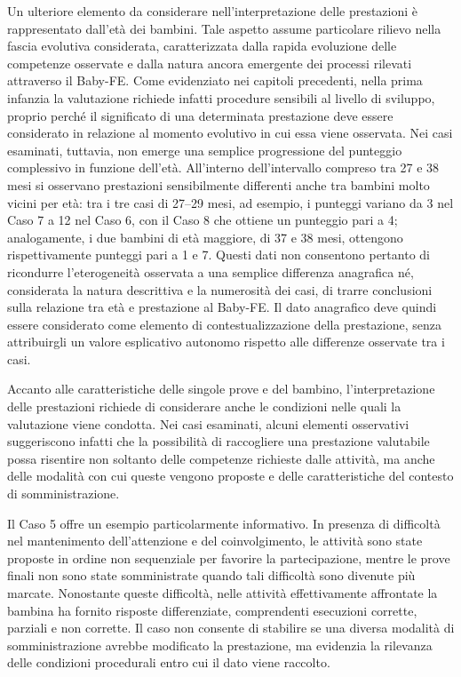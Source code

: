 Un ulteriore elemento da considerare nell'interpretazione delle prestazioni è rappresentato dall'età dei bambini. Tale aspetto assume particolare rilievo nella fascia evolutiva considerata, caratterizzata dalla rapida evoluzione delle competenze osservate e dalla natura ancora emergente dei processi rilevati attraverso il Baby-FE. Come evidenziato nei capitoli precedenti, nella prima infanzia la valutazione richiede infatti procedure sensibili al livello di sviluppo, proprio perché il significato di una determinata prestazione deve essere considerato in relazione al momento evolutivo in cui essa viene osservata. Nei casi esaminati, tuttavia, non emerge una semplice progressione del punteggio complessivo in funzione dell'età. All'interno dell'intervallo compreso tra 27 e 38 mesi si osservano prestazioni sensibilmente differenti anche tra bambini molto vicini per età: tra i tre casi di 27--29 mesi, ad esempio, i punteggi variano da 3 nel Caso 7 a 12 nel Caso 6, con il Caso 8 che ottiene un punteggio pari a 4; analogamente, i due bambini di età maggiore, di 37 e 38 mesi, ottengono rispettivamente punteggi pari a 1 e 7. Questi dati non consentono pertanto di ricondurre l'eterogeneità osservata a una semplice differenza anagrafica né, considerata la natura descrittiva e la numerosità dei casi, di trarre conclusioni sulla relazione tra età e prestazione al Baby-FE. Il dato anagrafico deve quindi essere considerato come elemento di contestualizzazione della prestazione, senza attribuirgli un valore esplicativo autonomo rispetto alle differenze osservate tra i casi.

Accanto alle caratteristiche delle singole prove e del bambino, l'interpretazione delle prestazioni richiede di considerare anche le condizioni nelle quali la valutazione viene condotta. Nei casi esaminati, alcuni elementi osservativi suggeriscono infatti che la possibilità di raccogliere una prestazione valutabile possa risentire non soltanto delle competenze richieste dalle attività, ma anche delle modalità con cui queste vengono proposte e delle caratteristiche del contesto di somministrazione.

Il Caso 5 offre un esempio particolarmente informativo. In presenza di difficoltà nel mantenimento dell'attenzione e del coinvolgimento, le attività sono state proposte in ordine non sequenziale per favorire la partecipazione, mentre le prove finali non sono state somministrate quando tali difficoltà sono divenute più marcate. Nonostante queste difficoltà, nelle attività effettivamente affrontate la bambina ha fornito risposte differenziate, comprendenti esecuzioni corrette, parziali e non corrette. Il caso non consente di stabilire se una diversa modalità di somministrazione avrebbe modificato la prestazione, ma evidenzia la rilevanza delle condizioni procedurali entro cui il dato viene raccolto.

